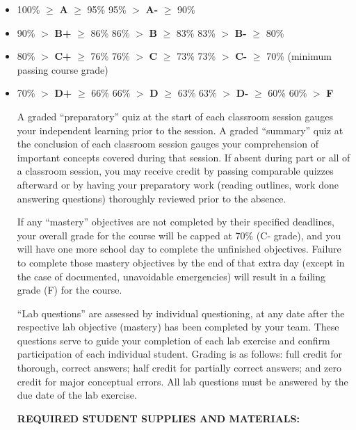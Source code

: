 \begin{itemize}
\item{} 100\% $\geq$ {\bf A} $\geq$ 95\% \hskip 33pt 95\% $>$ {\bf A-} $\geq$ 90\%
\item{} 90\% $>$ {\bf B+} $\geq$ 86\% \hskip 30pt 86\% $>$ {\bf B} $\geq$ 83\% \hskip 30pt 83\% $>$ {\bf B-} $\geq$ 80\%
\item{} 80\% $>$ {\bf C+} $\geq$ 76\% \hskip 30pt 76\% $>$ {\bf C} $\geq$ 73\% \hskip 30pt 73\% $>$ {\bf C-} $\geq$ 70\% (minimum passing course grade)
\item{} 70\% $>$ {\bf D+} $\geq$ 66\% \hskip 30pt 66\% $>$ {\bf D} $\geq$ 63\% \hskip 30pt 63\% $>$ {\bf D-} $\geq$ 60\% \hskip 30pt 60\% $>$ {\bf F}
\medskip

\vskip 10pt

A graded ``preparatory'' quiz at the start of each classroom session gauges your independent learning prior to the session.  A graded ``summary'' quiz at the conclusion of each classroom session gauges your comprehension of important concepts covered during that session.  If absent during part or all of a classroom session, you may receive credit by passing comparable quizzes afterward or by having your preparatory work (reading outlines, work done answering questions) thoroughly reviewed prior to the absence.  

If any ``mastery'' objectives are not completed by their specified deadlines, your overall grade for the course will be capped at 70\% (C- grade), and you will have one more school day to complete the unfinished objectives.  Failure to complete those mastery objectives by the end of that extra day (except in the case of documented, unavoidable emergencies) will result in a failing grade (F) for the course.

``Lab questions'' are assessed by individual questioning, at any date after the respective lab objective (mastery) has been completed by your team.  These questions serve to guide your completion of each lab exercise and confirm participation of each individual student.  Grading is as follows: full credit for thorough, correct answers; half credit for partially correct answers; and zero credit for major conceptual errors.  All lab questions must be answered by the due date of the lab exercise.


\vfil \eject

\noindent
{\bf REQUIRED STUDENT SUPPLIES AND MATERIALS:} 


\end{itemize}
